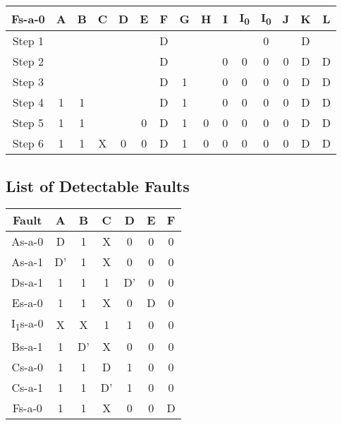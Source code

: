 \documentclass[11pt]{report}
\begin{document}
\begin{tabular}{ |c||c|c|c|c|c|c|c|c|c|c|c|c|c|c| }
\hline
\bf Fs-a-0 & \bf A & \bf B & \bf C & \bf D & \bf E & \bf F & G & H & I & I\textsubscript{0} & I\textsubscript{0} & J & K & \bf L \\
\hline
\hline
Step 1 & & & & & & D & & & & & 0 & & D & \\
\hline
Step 2 & & & & & & D & & & 0 & 0 & 0 & 0 & D & D \\
\hline
Step 3 & & & & & & D & 1 & & 0 & 0 & 0 & 0 & D & D \\
\hline
Step 4 & 1 & 1 & & & & D & 1 & & 0 & 0 & 0 & 0 & D & D \\
\hline
Step 5 & 1 & 1 & & & 0 & D & 1 & 0 & 0 & 0 & 0 & 0 & D & D \\
\hline
Step 6 & 1 & 1 & X & 0 & 0 & D & 1 & 0 & 0 & 0 & 0 & 0 & D & D \\
\hline
\end{tabular}

\subsection*{List of Detectable Faults}
\begin{tabular}{|c||c|c|c|c|c|c|}
    \hline
    Fault & A & B & C & D & E & F
    \\
    \hline
    \hline
    As-a-0 & D & 1 & X & 0 & 0 & 0 \\
    \hline
    As-a-1 & D' & 1 & X & 0 & 0 & 0 \\
    \hline
    Ds-a-1 & 1 & 1 & 1 & D' & 0 & 0 \\
    \hline
    Es-a-0 & 1 & 1 & X & 0 & D & 0 \\
    \hline
    I\textsubscript{1}s-a-0 & X & X & 1 & 1 & 0 & 0 \\
    \hline
    Bs-a-1 & 1 & D' & X & 0 & 0 & 0 \\
    \hline
    Cs-a-0 & 1 & 1 & D & 1 & 0 & 0 \\
    \hline
    Cs-a-1 & 1 & 1 & D' & 1 & 0 & 0 \\
    \hline
    Fs-a-0 & 1 & 1 & X & 0 & 0 & D \\
    \hline
\end{tabular}
\end{document}
